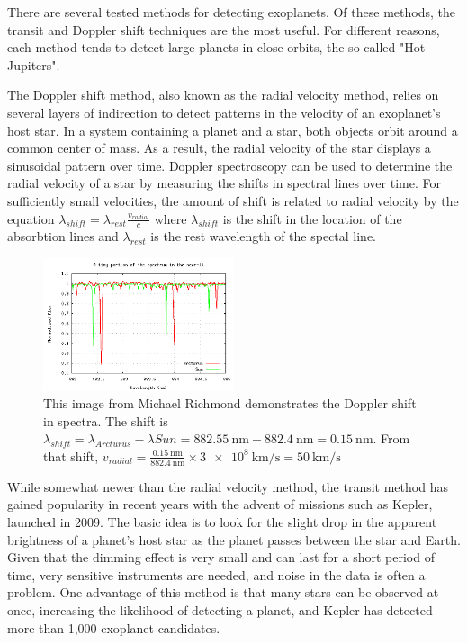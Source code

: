 There are several tested methods for detecting exoplanets. Of these methods, the transit and Doppler
shift techniques are the most useful. For different reasons, each method tends to detect large planets
in close orbits, the so-called "Hot Jupiters".

The Doppler shift method, also known as the radial velocity method, relies on several layers of indirection
to detect patterns in the velocity of an exoplanet's host star. In a system containing a planet and a star,
both objects orbit around a common center of mass.\autocite{jplMethods} As a result, the radial velocity
of the star displays a sinusoidal pattern over time. Doppler spectroscopy can be used to determine the radial
velocity of a star by measuring the shifts in spectral lines over time. For sufficiently small velocities,
the amount of shift is related to radial velocity by the equation
\( \lambda_{shift} = \lambda_{rest} \frac{v_{radial}}{c} \)
where \(\lambda_{shift}\) is the shift in the location of the absorbtion lines and
\(\lambda_{rest}\) is the rest wavelength of the spectal line.\autocite{dopplerSpectroscopy}

\begin{figure}[H]
	\centering
	\includegraphics[width=0.5\textwidth]{images/spec_sun_arcturus}
	\caption{This image from Michael Richmond demonstrates the Doppler shift in spectra. \autocite{dopplerSpectroscopy}
	The shift is \( \lambda_{shift} = \lambda_{Arcturus} - \lambda{Sun} = \SI{882.55}{\nano\meter} - \SI{882.4}{\nano\meter} =  \SI{0.15}{\nano\meter}\).
	From that shift, \( v_{radial} = \frac{ \SI{0.15}{\nano\meter} }{ \SI{882.4}{\nano\meter} } \times \SI{3e8}{\kilo\meter\per\second} = \SI{50}{\kilo\meter\per\second} \)}
\end{figure}

While somewhat newer than the radial velocity method, the transit method has gained popularity in recent years
with the advent of missions such as Kepler, launched in 2009. The basic idea is to look for the slight drop
in the apparent brightness of a planet's host star as the planet passes between the star and Earth. Given that the
dimming effect is very small and can last for a short period of time, very sensitive instruments are needed,
and noise in the data is often a problem.\autocite{jplMethods} One advantage of this method is that
many stars can be observed at once, increasing the likelihood of detecting a planet, and Kepler
has detected more than 1,000 exoplanet candidates.\autocite{jplMethods}

